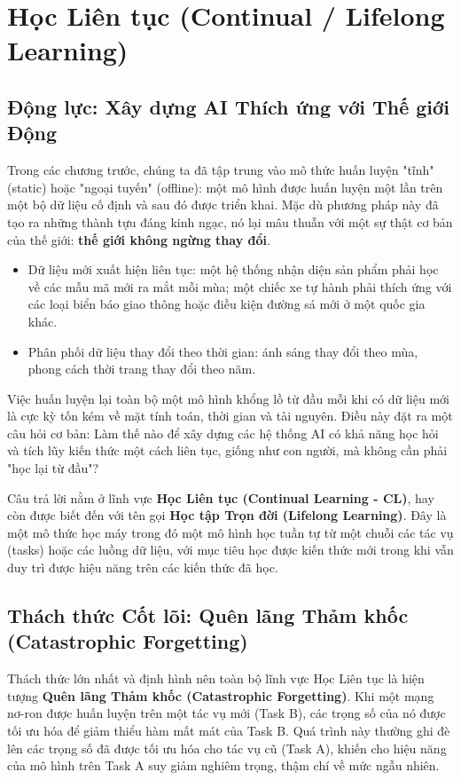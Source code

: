 \section{Học Liên tục (Continual / Lifelong Learning)}
\label{sec:continual_learning}

\subsection{Động lực: Xây dựng AI Thích ứng với Thế giới Động}
\label{subsec:cl_motivation}
Trong các chương trước, chúng ta đã tập trung vào mô thức huấn luyện "tĩnh" (static) hoặc "ngoại tuyến" (offline): một mô hình được huấn luyện một lần trên một bộ dữ liệu cố định và sau đó được triển khai. Mặc dù phương pháp này đã tạo ra những thành tựu đáng kinh ngạc, nó lại mâu thuẫn với một sự thật cơ bản của thế giới: \textbf{thế giới không ngừng thay đổi}.
\begin{itemize}
	\item Dữ liệu mới xuất hiện liên tục: một hệ thống nhận diện sản phẩm phải học về các mẫu mã mới ra mắt mỗi mùa; một chiếc xe tự hành phải thích ứng với các loại biển báo giao thông hoặc điều kiện đường sá mới ở một quốc gia khác.
	\item Phân phối dữ liệu thay đổi theo thời gian: ánh sáng thay đổi theo mùa, phong cách thời trang thay đổi theo năm.
\end{itemize}
Việc huấn luyện lại toàn bộ một mô hình khổng lồ từ đầu mỗi khi có dữ liệu mới là cực kỳ tốn kém về mặt tính toán, thời gian và tài nguyên. Điều này đặt ra một câu hỏi cơ bản: Làm thế nào để xây dựng các hệ thống AI có khả năng học hỏi và tích lũy kiến thức một cách liên tục, giống như con người, mà không cần phải "học lại từ đầu"?

Câu trả lời nằm ở lĩnh vực \textbf{Học Liên tục (Continual Learning - CL)}, hay còn được biết đến với tên gọi \textbf{Học tập Trọn đời (Lifelong Learning)}. Đây là một mô thức học máy trong đó một mô hình học tuần tự từ một chuỗi các tác vụ (tasks) hoặc các luồng dữ liệu, với mục tiêu học được kiến thức mới trong khi vẫn duy trì được hiệu năng trên các kiến thức đã học.

\subsection{Thách thức Cốt lõi: Quên lãng Thảm khốc (Catastrophic Forgetting)}
\label{subsec:catastrophic_forgetting}
Thách thức lớn nhất và định hình nên toàn bộ lĩnh vực Học Liên tục là hiện tượng \textbf{Quên lãng Thảm khốc (Catastrophic Forgetting)}. Khi một mạng nơ-ron được huấn luyện trên một tác vụ mới (Task B), các trọng số của nó được tối ưu hóa để giảm thiểu hàm mất mát của Task B. Quá trình này thường ghi đè lên các trọng số đã được tối ưu hóa cho tác vụ cũ (Task A), khiến cho hiệu năng của mô hình trên Task A suy giảm nghiêm trọng, thậm chí về mức ngẫu nhiên.

